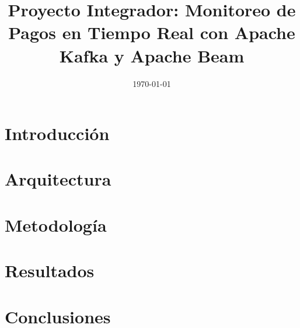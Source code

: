 \documentclass[11pt]{article}
\title{Proyecto Integrador: Monitoreo de Pagos en Tiempo Real con Apache Kafka y Apache Beam}
\author{}
\date{\today}
\begin{document}
\maketitle

\section{Introducción}

\section{Arquitectura}

\section{Metodología}

\section{Resultados}

\section{Conclusiones}
\end{document}
